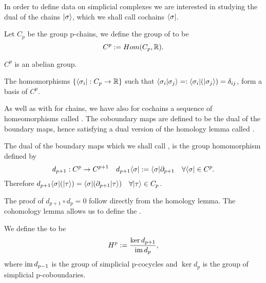 \documentclass[../1.tex]{subfiles}
\begin{document}
    In order to define data on simplicial complexes we are interested in studying the dual of the chains $| \sigma \rangle$,
    which we shall call cochains $\langle \sigma |$.
       
    \begin{defn}
        Let $C_p$ be the group p-chains, we define the group of  to 
        be \[C^p := Hom(C_p, \mathbb{R}).\]
    \end{defn}

    \begin{prop}
        $C^p$ is an abelian group.
    \end{prop}

    \begin{prop}
        The homomorphisms $\{\langle \sigma_i |:C_p \to \mathbb{R}\}$ such that $\langle \sigma_i | \sigma_j \rangle =: \langle \sigma_i |(| \sigma_j \rangle) = \delta_{ij}$,
        form a basis of $C^p$.
    \end{prop}

    As well as with for chains, we have also for cochains a sequence of homeomorphisms called . The coboundary maps are defined
    to be the dual of the boundary maps, hence satisfying a dual version of the homology lemma called .

    \begin{defn}
        \label{dualrel}
        The dual of the boundary maps which we shall call
        , is the group homomorphism defined by
        \[ d_{p+1} : C^p \to C^{p+1} \quad d_{p+1}\langle \sigma | := \langle \sigma | \partial_{p+1} \quad \forall \langle \sigma | \in C^p.\]
        Therefore $d_{p+1}\langle \sigma |(| \tau \rangle) = \langle \sigma | (\partial_{p+1}| \tau \rangle) \quad \forall | \tau \rangle \in C_p$.
    \end{defn}

    The proof of $d_{p+1} \circ d_p = 0$ follow directly from the homology lemma. The cohomology lemma allows us to define the .
    
    \begin{defn}
        We define the  to be 
        \[H^p := \frac{\ker d_{p+1}}{\mathrm{im}\, d_{p}},\] 
        where $\mathrm{im}\, d_{p-1}$ is the group of simplicial p-cocycles and
        $\ker d_p$ is the group of simplicial p-coboundaries.
    \end{defn}

\end{document}
